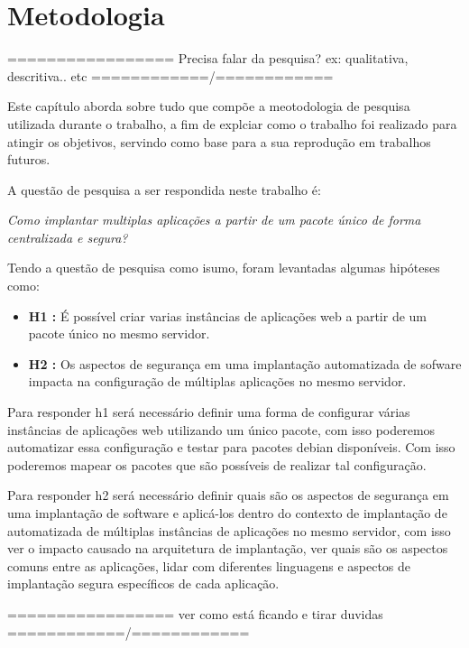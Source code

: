 \chapter{Metodologia}
\label{cap-metodologia}

================= Precisa falar da pesquisa? ex: qualitativa, descritiva.. etc ============/============

Este capítulo aborda sobre tudo que compõe a meotodologia de pesquisa utilizada
durante o trabalho, a fim de explciar como o trabalho foi realizado para atingir os
objetivos, servindo como base para a sua reprodução em trabalhos futuros.

A questão de pesquisa a ser respondida neste trabalho é:

\begin{center}
  \textit{
    Como implantar multiplas aplicações a partir de um pacote único
    de forma centralizada e segura?
}
\end{center}

Tendo a questão de pesquisa como isumo, foram levantadas algumas hipóteses  como:

\begin{itemize}
  \item  \textbf{H1 :} É possível criar varias instâncias de aplicações
  web a partir de um pacote único no mesmo servidor.
  \item  \textbf{H2 :} Os aspectos de segurança em uma implantação
   automatizada de sofware impacta na configuração de múltiplas aplicações no
   mesmo servidor.
\end{itemize}

Para responder h1 será necessário definir uma forma de configurar várias instâncias
de aplicações web utilizando um único pacote, com isso poderemos automatizar
essa configuração e testar para pacotes debian disponíveis. Com isso poderemos
mapear os pacotes que são possíveis de realizar tal configuração.

Para responder h2 será necessário definir quais são os aspectos de segurança em
uma implantação de software e aplicá-los dentro do contexto de implantação de
automatizada de  múltiplas instâncias de aplicações no mesmo servidor,
com isso ver o impacto causado na arquitetura de implantação, ver quais são os
aspectos comuns entre as aplicações, lidar com diferentes linguagens e aspectos
de implantação segura específicos de cada aplicação.

================= ver como está ficando e tirar duvidas ============/============

